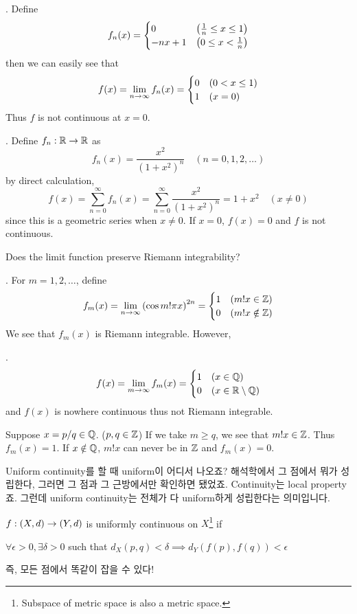 \ex. Define
\[
    f_n(x) = \begin{cases}
        0       & \left( \frac{1}{n} \leq x \leq 1 \right) \\
        -nx + 1 & \left( 0 \leq x < \frac{1}{n} \right)
    \end{cases}
\]
then we can easily see that
\[
    f(x) = \lim_{n\rightarrow \infty} f_n(x) = \begin{cases}
        0 & (0 < x \leq 1) \\
        1 & (x = 0)
    \end{cases}
\]
Thus \(f\) is not continuous at \(x = 0\).

\ex. Define \(f_n: \mathbb{R} \rightarrow \mathbb{R}\) as
\[
    f_n(x) = \frac{x^2}{(1+x^2)^n} \quad (n = 0, 1, 2, \dots)
\]
by direct calculation,
\[
    f(x) = \sum_{n = 0}^\infty f_n(x) = \sum_{n = 0}^\infty \frac{x^2}{(1+x^2)^n} = 1 + x^2 \quad (x \neq 0)
\]
since this is a geometric series when \(x \neq 0\). If \(x = 0\), \(f(x) = 0\) and \(f\) is not continuous.

Does the limit function preserve Riemann integrability?

\ex. For \(m = 1, 2, \dots\), define
\[
    f_m(x) = \lim_{n\rightarrow \infty} \left(\cos m! \pi x\right)^{2n} = \begin{cases}
        1 & (m!x \in \mathbb{Z}) \\
        0 & (m!x \notin \mathbb{Z})
    \end{cases}
\]
We see that \(f_m(x)\) is Riemann integrable. However,

\claim.
\[
    f(x) = \lim_{m\rightarrow \infty} f_m(x) = \begin{cases}
        1 & (x\in \mathbb{Q}) \\
        0 & (x \in \mathbb{R} \setminus \mathbb{Q})
    \end{cases}
\]
and \(f(x)\) is nowhere continuous thus not Riemann integrable.

\pf Suppose \(x = p/q \in \mathbb{Q}\). (\(p, q\in \mathbb{Z}\)) If we take \(m \geq q\), we see that \(m! x \in \mathbb{Z}\). Thus \(f_m(x) = 1\). If \(x \notin \mathbb{Q}\), \(m! x\) can never be in \(\mathbb{Z}\) and \(f_m(x) = 0\).

\medskip

\question Uniform continuity를 할 때 uniform이 어디서 나오죠? 해석학에서 그 점에서 뭐가 성립한다, 그러면 그 점과 그 근방에서만 확인하면 됐었죠. Continuity는 local property죠. 그런데 uniform continuity는 전체가 다 uniform하게 성립한다는 의미입니다.

\recall \(f: (X, d) \rightarrow (Y, d)\) is uniformly continuous on \(X\)\footnote{Subspace of metric space is also a metric space.} if
\begin{center}
    \(\forall \epsilon > 0, \exists \delta > 0\) such that \(d_X(p, q) < \delta \implies d_Y(f(p), f(q)) < \epsilon\)
\end{center}
즉, 모든 점에서 똑같이 잡을 수 있다!

